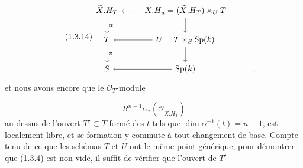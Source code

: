 \begin{equation}\tag{1.3.14}
\begin{tikzcd}
\widetilde{X}.H_T \arrow[d, "\alpha"] & X.H_u = (\widetilde{X}.H_T) \times_U T \arrow[l] \arrow[d] \\
T \arrow[d, "\pi"] & U = T \times_S \mathrm{Sp}(k) \arrow[l] \arrow[d] \\
S & \mathrm{Sp}(k) \arrow[l] & ,
\end{tikzcd}
\end{equation}
et nous avons encore que le $\mathcal{O}_T$-module

\begin{equation}\tag{1.3.15}
R^{n-1}\alpha_*(\mathcal{O}_{\widetilde{X}.H_T})
\end{equation}
au-dessus de l'ouvert $T' \subset T$ formé des $t$ tels que $\dim \alpha^{-1}(t) = n-1$, est localement libre, et se formation y commute à tout changement de base. Compte tenu de ce que les schémas $T$ et $U$ ont le \underline{même} point générique, pour démontrer que (1.3.4) est non vide, il suffit de vérifier que l'ouvert de $T'$

